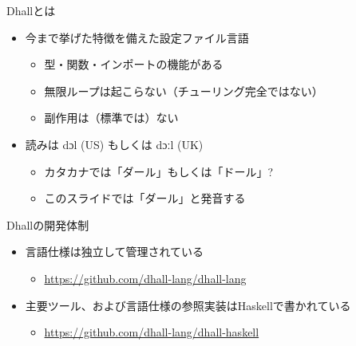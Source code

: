 \documentclass[unicode,12pt]{beamer}
\begin{document}
\begin{frame}{Dhallとは}
  \begin{itemize}
    \item 今まで挙げた特徴を備えた設定ファイル言語
      \begin{itemize}
      \item \alert{型・関数・インポート}の機能がある
      \item 無限ループは起こらない（チューリング完全ではない）
      \item 副作用は（標準では）ない
      \end{itemize}
    \item 読みは {\doulos dɔl} (US) もしくは {\doulos dɔːl} (UK)
      \begin{itemize}
      \item カタカナでは「ダール」もしくは「ドール」?
      \item このスライドでは「ダール」と発音する
      \end{itemize}
  \end{itemize}
\end{frame}

\begin{frame}{Dhallの開発体制}
  \begin{itemize}
    \item 言語仕様は独立して管理されている
      \begin{itemize}
      \item \url{https://github.com/dhall-lang/dhall-lang}
      \end{itemize}
    \item 主要ツール、および言語仕様の参照実装はHaskellで書かれている
      \begin{itemize}
      \item \url{https://github.com/dhall-lang/dhall-haskell}
      \end{itemize}
  \end{itemize}
\end{frame}
\end{document}
